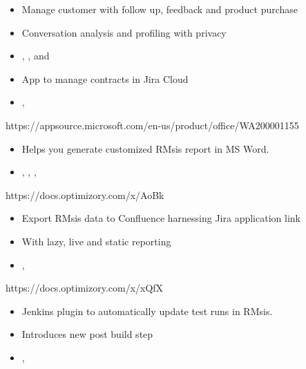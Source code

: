 \documentclass[10pt,a4paper,ragged2e]{altacv}
\begin{document}
\divider

\begin{itemize}
\item Manage customer with follow up, feedback and product purchase
\item Conversation analysis and profiling with privacy
\item {}, , and 
\end{itemize}

\divider

\begin{itemize}
\item App to manage contracts in Jira Cloud
\item {}, 
\end{itemize}



\divider

{https://appsource.microsoft.com/en-us/product/office/WA200001155}
\begin{itemize}
    \item Helps you generate customized RMsis report in MS Word.
    \item {}, , , 
\end{itemize}

\divider




{https://docs.optimizory.com/x/AoBk}
\begin{itemize}
\item Export RMsis data to Confluence harnessing Jira application link
\item With lazy, live and static reporting
\item {}, 
\end{itemize}

\divider

{https://docs.optimizory.com/x/xQfX}
\begin{itemize}
\item Jenkins plugin to automatically update test runs in RMsis.
\item Introduces new post build step
\item {}, 
\end{itemize}
\end{document}

